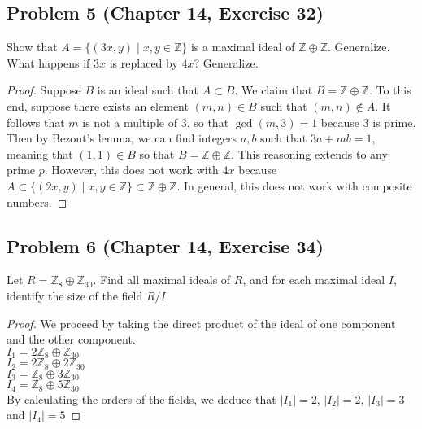 \documentclass{article}
\begin{document}
\subsection*{Problem 5 (Chapter 14, Exercise 32)}
Show that $A = \{(3x, y) \mid x, y \in \mathbb{Z}\}$ is a maximal ideal of $\mathbb{Z} \oplus \mathbb{Z}$. Generalize. What happens if $3x$ is replaced by $4x$? Generalize.
\begin{proof} 
Suppose $B$ is an ideal such that $A \subset B$. We claim that $B = \mathbb{Z} \oplus \mathbb{Z}$. To this end, suppose there exists an element $(m, n) \in B$ such that $(m, n) \notin A$. It follows that $m$ is not a multiple of 3, so that $\gcd{(m, 3)} = 1$ because $3$ is prime. Then by Bezout's lemma, we can find integers $a, b$ such that $3a + mb = 1$, meaning that $(1, 1) \in B$ so that $B = \mathbb{Z} \oplus \mathbb{Z}$. This reasoning extends to any prime $p$. However, this does not work with $4x$ because $A \subset \{(2x, y) \mid x, y \in \mathbb{Z}\} \subset \mathbb{Z} \oplus \mathbb{Z}$. In general, this does not work with composite numbers.
\end{proof}


\subsection*{Problem 6 (Chapter 14, Exercise 34)}
Let $R = \mathbb{Z}_8 \oplus \mathbb{Z}_{30}$. Find all maximal ideals of $R$, and for each maximal ideal $I$, identify the size of the field $R/I$.
\begin{proof}
We proceed by taking the direct product of the ideal of one component and the other component. \\
$I_1 = 2\mathbb{Z}_8 \oplus \mathbb{Z}_{30}$ \\ $I_2 = 2\mathbb{Z}_8 \oplus 2\mathbb{Z}_{30}$ \\ $I_3 = \mathbb{Z}_8 \oplus 3\mathbb{Z}_{30}$ \\ $I_4 = \mathbb{Z}_8 \oplus 5\mathbb{Z}_{30}$ \\
By calculating the orders of the fields, we deduce that $|I_1| = 2$, $|I_2| = 2$, $|I_3| = 3$ and $|I_4| = 5$
\end{proof}
\end{document}
